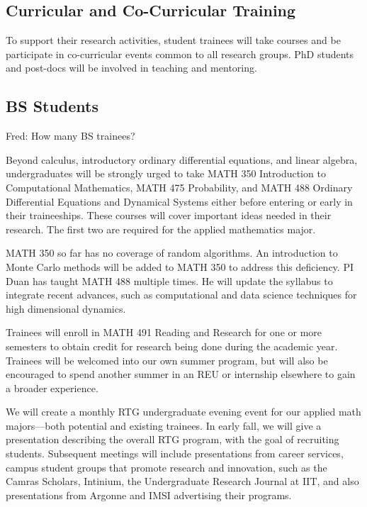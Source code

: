 \documentclass[11pt]{NSFamsart}
\newcommand{\FredNote}[1]{{\color{blue} Fred: #1}}
\begin{document}
\subsection{Curricular and Co-Curricular Training}
To support their research activities, student trainees will take courses and be participate in co-curricular events common to all research groups.  PhD students and post-docs will be involved in teaching and mentoring. 

\subsection*{BS Students} \FredNote{How many BS trainees?}

Beyond calculus, introductory ordinary differential equations, and linear algebra, undergraduates will be strongly urged to take MATH 350 Introduction to Computational Mathematics, MATH 475 Probability, and MATH 488 Ordinary Differential Equations and Dynamical Systems either before entering or early in their traineeships.  These courses will cover important ideas needed in their research.  The first two are required for the applied mathematics major.  

MATH 350 so far has no coverage of random algorithms. An introduction to Monte Carlo methods will be added to MATH 350 to address this deficiency.
PI Duan has taught MATH 488 multiple  times.  He will update the syllabus to integrate recent advances, such as computational and data science techniques for high dimensional dynamics. 

Trainees will enroll in MATH 491 Reading and Research for one or more semesters to obtain credit for research being done during the academic year.  Trainees will be welcomed into our own summer program, but will also be encouraged to spend another summer in an REU or internship elsewhere to gain a broader experience.

We will create a monthly RTG undergraduate evening event for our applied math majors---both potential and existing trainees.  In early fall, we will give a presentation describing the overall RTG program, with the goal of recruiting students. Subsequent meetings will include presentations from   career services, campus student groups that promote research and innovation, such as the Camras Scholars, Intinium, the Undergraduate Research Journal at IIT, and also presentations from Argonne and IMSI advertising their programs. 
\end{document}
